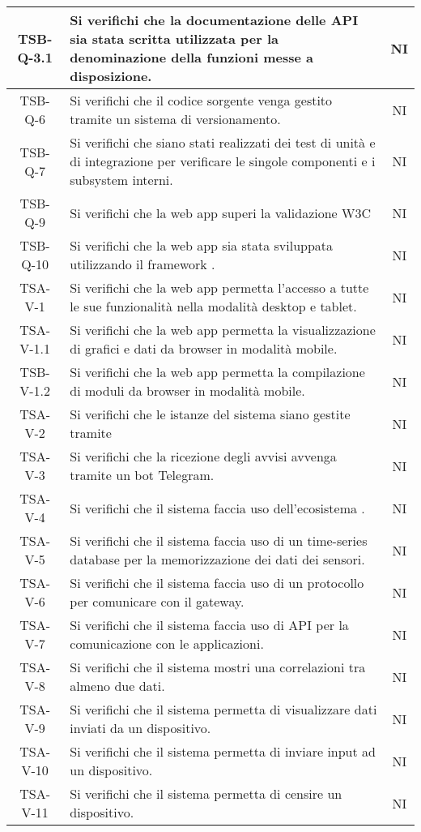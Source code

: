 \begin{center}
\begin{longtable}{|c|p{10cm}|c|}
			 \hline
			 TSB-Q-3.1 & Si verifichi che la documentazione delle API sia stata scritta utilizzata per la denominazione della funzioni messe a disposizione. & NI \\
			 \hline
			 TSB-Q-6 & Si verifichi che il codice sorgente venga gestito tramite un sistema di versionamento. & NI \\
			 \hline
			 TSB-Q-7 & Si verifichi che siano stati realizzati dei test di unità e di integrazione per verificare le singole componenti e i subsystem interni. & NI \\
			 \hline
			 TSB-Q-9 & Si verifichi che la web app superi la validazione W3C & NI \\
			 \hline
			 TSB-Q-10 & Si verifichi che la web app sia stata sviluppata utilizzando il framework \glock{Bootstrap}. & NI \\
			 \hline
			 TSA-V-1 & Si verifichi che la web app permetta l'accesso a tutte le sue funzionalità nella modalità desktop e tablet. & NI \\ 
			 \hline
			 TSA-V-1.1 & Si verifichi che la web app permetta la visualizzazione di grafici e dati da browser in modalità mobile. & NI \\ 
			 \hline
			 TSB-V-1.2 & Si verifichi che la web app permetta la compilazione di moduli da browser in modalità mobile. & NI \\
			 \hline
			 TSA-V-2 & Si verifichi che le istanze del sistema siano gestite tramite \glock{Docker} & NI \\
			 \hline
			 TSA-V-3 & Si verifichi che la ricezione degli avvisi avvenga tramite un bot Telegram. & NI \\
			 \hline 
			 TSA-V-4 & Si verifichi che il sistema faccia uso dell'ecosistema \glock{Kafka}. & NI \\
			 \hline
			 TSA-V-5 & Si verifichi che il sistema faccia uso di un time-series database per la memorizzazione dei dati dei sensori. & NI \\
			 \hline
			 TSA-V-6 & Si verifichi che il sistema faccia uso di un protocollo per comunicare con il gateway. & NI \\
			 \hline
			 TSA-V-7 & Si verifichi che il sistema faccia uso di API per la comunicazione con le applicazioni. & NI \\
			 \hline
			 TSA-V-8 & Si verifichi che il sistema mostri una correlazioni tra almeno due dati. & NI \\
			 \hline
			 TSA-V-9 & Si verifichi che il sistema permetta di visualizzare dati inviati da un dispositivo. & NI \\
			 \hline
			 TSA-V-10 & Si verifichi che il sistema permetta di inviare input ad un dispositivo. & NI \\
			 \hline
			 TSA-V-11 & Si verifichi che il sistema permetta di censire un dispositivo. & NI \\
			 \hline
			 

\end{longtable}
\end{center}
